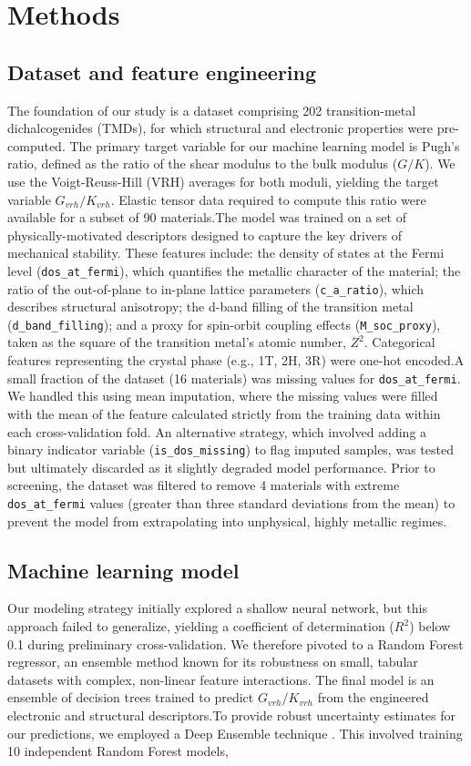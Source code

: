 \documentclass[]{article}
\begin{document}
\section{Methods}
\label{sec:methods}
\subsection{Dataset and feature engineering}The foundation of our study is a dataset comprising 202 transition-metal dichalcogenides (TMDs), for which structural and electronic properties were pre-computed. The primary target variable for our machine learning model is Pugh's ratio, defined as the ratio of the shear modulus to the bulk modulus ($G/K$). We use the Voigt-Reuss-Hill (VRH) averages for both moduli, yielding the target variable $G_{vrh}/K_{vrh}$. Elastic tensor data required to compute this ratio were available for a subset of 90 materials.The model was trained on a set of physically-motivated descriptors designed to capture the key drivers of mechanical stability. These features include: the density of states at the Fermi level (\texttt{dos\_at\_fermi}), which quantifies the metallic character of the material; the ratio of the out-of-plane to in-plane lattice parameters (\texttt{c\_a\_ratio}), which describes structural anisotropy; the d-band filling of the transition metal (\texttt{d\_band\_filling}); and a proxy for spin-orbit coupling effects (\texttt{M\_soc\_proxy}), taken as the square of the transition metal's atomic number, $Z^2$. Categorical features representing the crystal phase (e.g., 1T, 2H, 3R) were one-hot encoded.A small fraction of the dataset (16 materials) was missing values for \texttt{dos\_at\_fermi}. We handled this using mean imputation, where the missing values were filled with the mean of the feature calculated strictly from the training data within each cross-validation fold. An alternative strategy, which involved adding a binary indicator variable (\texttt{is\_dos\_missing}) to flag imputed samples, was tested but ultimately discarded as it slightly degraded model performance. Prior to screening, the dataset was filtered to remove 4 materials with extreme \texttt{dos\_at\_fermi} values (greater than three standard deviations from the mean) to prevent the model from extrapolating into unphysical, highly metallic regimes.\subsection{Machine learning model}Our modeling strategy initially explored a shallow neural network, but this approach failed to generalize, yielding a coefficient of determination ($R^2$) below 0.1 during preliminary cross-validation. We therefore pivoted to a Random Forest regressor, an ensemble method known for its robustness on small, tabular datasets with complex, non-linear feature interactions. The final model is an ensemble of decision trees trained to predict $G_{vrh}/K_{vrh}$ from the engineered electronic and structural descriptors.To provide robust uncertainty estimates for our predictions, we employed a Deep Ensemble technique \citep{lakshminarayanan2017simplescalablepredictiveuncertainty}. This involved training 10 independent Random Forest models, 
\end{document}
